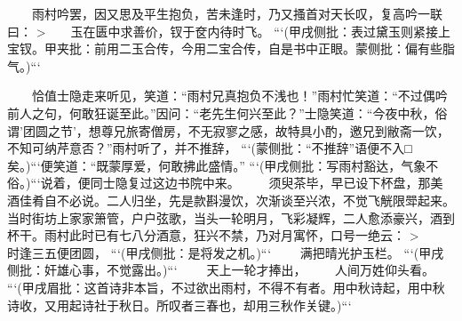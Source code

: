 \documentclass[
    ref = refDemo.bib,
    coverpage = cover.pdf,
    geometry = b5,
    lang = cn
]{spBook}
\begin{document}
    　　雨村吟罢，因又思及平生抱负，苦未逢时，乃又搔首对天长叹，复高吟一联曰：  
    >　　玉在匮中求善价，钗于奁内待时飞。 ```(甲戌侧批：表过黛玉则紧接上宝钗。甲夹批：前用二玉合传，今用二宝合传，自是书中正眼。蒙侧批：偏有些脂气。)```  

    　　恰值士隐走来听见，笑道：“雨村兄真抱负不浅也！”雨村忙笑道：“不过偶吟前人之句，何敢狂诞至此。”因问：“老先生何兴至此？”士隐笑道：“今夜中秋，俗谓’团圆之节’，想尊兄旅寄僧房，不无寂寥之感，故特具小酌，邀兄到敝斋一饮，不知可纳芹意否？”雨村听了，并不推辞， ```(蒙侧批：“不推辞”语便不入□矣。)```便笑道：“既蒙厚爱，何敢拂此盛情。” ```(甲戌侧批：写雨村豁达，气象不俗。)```说着，便同士隐复过这边书院中来。  
    　　须臾茶毕，早已设下杯盘，那美酒佳肴自不必说。二人归坐，先是款斟漫饮，次渐谈至兴浓，不觉飞觥限斝起来。当时街坊上家家箫管，户户弦歌，当头一轮明月，飞彩凝辉，二人愈添豪兴，酒到杯干。雨村此时已有七八分酒意，狂兴不禁，乃对月寓怀，口号一绝云：  
    >　　时逢三五便团圆， ```(甲戌侧批：是将发之机。)```  
    　　满把晴光护玉栏。 ```(甲戌侧批：奸雄心事，不觉露出。)```  
    　　天上一轮才捧出，  
    　　人间万姓仰头看。 ```(甲戌眉批：这首诗非本旨，不过欲出雨村，不得不有者。用中秋诗起，用中秋诗收，又用起诗社于秋日。所叹者三春也，却用三秋作关键。)```  
\end{document}
